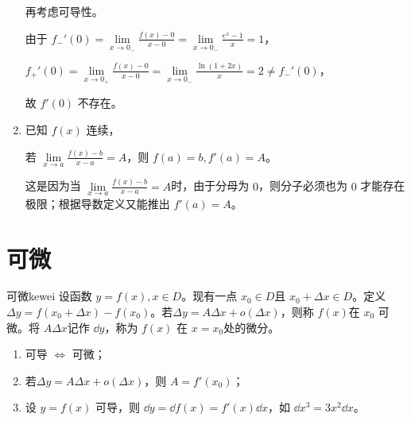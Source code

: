 \begin{note}
\begin{enumerate}
\begin{solution}
            再考虑可导性。
        
            由于 $f_{-}'(0)=\lim\limits_{x\to 0_{-}}\frac{f(x)-0}{x-0}=\lim\limits_{x \to 0_{-}}\frac{e^x-1}{x}=1$，
        
            $f_{+}'(0)=\lim\limits_{x\to 0_{+}}\frac{f(x)-0}{x-0}=\lim\limits_{x \to 0_{-}}\frac{\ln(1+2x)}{x}=2 \neq f_{-}'(0)$，
        
            故 $f'(0)$ 不存在。
        \end{solution}

        \item 已知 $f(x)$ 连续，
        
        若 $\lim\limits_{x \to a}\frac{f(x)-b}{x-a}=A$，则 $f(a)=b,f'(a)=A$。

        这是因为当 $\lim\limits_{x \to a}\frac{f(x)-b}{x-a}=A$时，由于分母为 $0$，则分子必须也为 $0$ 才能存在极限；根据导数定义又能推出 $f'(a)=A$。
        \end{enumerate}
        \end{note}
    \section{可微}
    \begin{definition}{可微}{kewei}
    设函数 $y=f(x),x\in D$。现有一点 $x_0\in D$且 $x_0+\Delta x \in D$。定义 $\Delta y=f(x_0+\Delta x)-f(x_0)$。若$\Delta y=A\Delta x+o(\Delta x)$，则称 $f(x)$在 $x_0$ 可微。将 $A\Delta x$记作 $\dd{y}$，称为 $f(x)$ 在 $x=x_0$处的微分。
    \end{definition}
    
    \begin{note}
        \begin{enumerate}
            \item 可导 $\Leftrightarrow$ 可微；
            \item 若$\Delta y = A\Delta x+o(\Delta x)$，则 $A=f'(x_0)$；
            \item 设 $y=f(x)$ 可导，则 $\dd{y} = \dd{f(x)}=f'(x)\dd{x}$，如 $\dd{x^3}=3x^2\dd{x}$。 
        \end{enumerate}
    \end{note}
